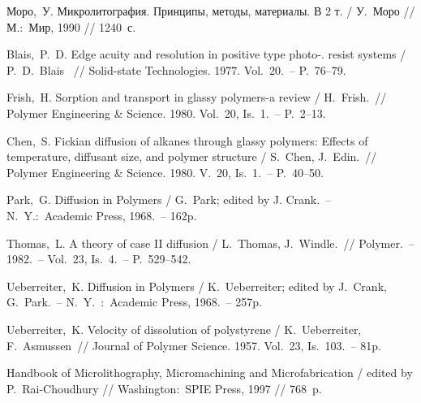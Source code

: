 \begin{thebibliography}{99}
 \tabfix Моро,~У. Микролитография. Принципы, методы, материалы. В 2 т. / У.~Моро // М.:~Мир, 1990 // 1240~с.

 \tabfix Blais,~P.~D. Edge acuity and resolution in positive type photo-.
resist systems / P.~D.~Blais~ // Solid-state Technologies. 1977. Vol.~20.~--
P.~76--79.

 \tabfix Frish,~H. Sorption and transport in glassy polymers-a review /
H.~Frish.~// Polymer Engineering \& Science. 1980. Vol.~20, Is.~1.~-- P.~2--13.

 \tabfix Chen,~S. Fickian diffusion of alkanes through glassy polymers:
Effects of temperature, diffusant size, and polymer structure / S.~Chen,
J.~Edin.~// Polymer Engineering \& Science. 1980. V.~20, Is.~1.~-- P.~40--50.

 \tabfix Park,~G. Diffusion in Polymers / G.~Park; edited by J. Crank.~--
N.~Y.:~Academic Press, 1968.~-- 162p.

 \tabfix Thomas,~L. A theory of case II diffusion / L.~Thomas,
J.~Windle.~// Polymer.~-- 1982.~-- Vol.~23, Is.~4.~-- P.~529--542.

 \tabfix Ueberreiter,~K. Diffusion in Polymers / K.~Ueberreiter; edited by
J.~Crank, G.~Park.~-- N.~Y.~:~Academic Press, 1968.~-- 257p.

 \tabfix Ueberreiter,~K. Velocity of dissolution of polystyrene /
K.~Ueberreiter, F.~Asmussen~// Journal of Polymer Science. 1957. Vol.~23,
Is.~103.~-- 81p.

 \tabfix Handbook of Microlithography, Micromachining and Microfabrication
/ edited by P.~Rai-Choudhury // Washington:~SPIE Press, 1997 // 768~p.

\end{thebibliography}

